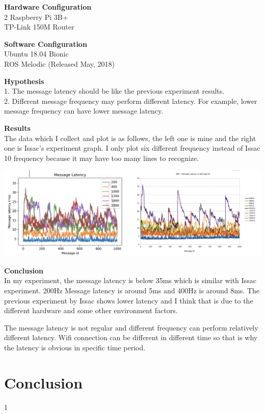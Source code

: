 \documentclass{mproj}
\begin{document}
\textbf{Hardware Configuration} \\
2 Raspberry Pi 3B+ \\
TP-Link 150M Router

\textbf{Software Configuration} \\
Ubuntu 18.04 Bionic \\
ROS Melodic (Released May, 2018)

\textbf{Hypothesis} \\
1. The message latency should be like the previous experiment results. \\
2. Different message frequency may perform different latency. For example, lower message frequency can have lower message latency.

\textbf{Results} \\
The data which I collect and plot is as follows, the left one is mine and the right one is Issac's experiment graph. I only plot six different frequency instead of Issac 10 frequency because it may have too many lines to recognize. 

\includegraphics[width = 1\textwidth]{compare.png}

\textbf{Conclusion} \\
In my experiment, the message latency is below 35ms which is similar with Issac experiment. 
200Hz Message latency is around 5ms and 400Hz is around 8ms.
The previous experiment by Issac shows lower latency and I think that is due to the different hardware and some other environment factors.

The message latency is not regular and different frequency can perform relatively different latency. Wifi connection can be different in different time so that is why the latency is obvious in specific time period.




\chapter{Conclusion}\label{conclusion}
1
\end{document}
